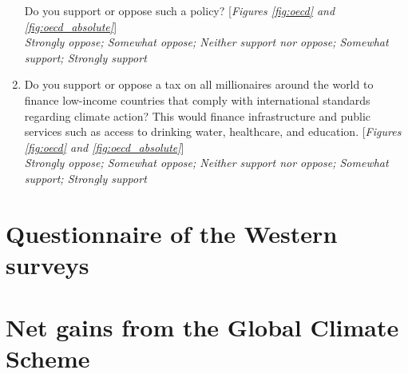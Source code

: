 \begin{enumerate}
Do you support or oppose such a policy?  [\textit{Figures \ref{fig:oecd} and \ref{fig:oecd_absolute}}]
\\ \textit{Strongly oppose; Somewhat oppose; Neither support nor oppose; Somewhat support; Strongly support}
\item \label{q:millionaire_tax} Do you support or oppose a tax on all millionaires around the world to finance low-income countries that comply with international standards regarding climate action? 
This would finance infrastructure and public services such as access to drinking water, healthcare, and education. [\textit{Figures \ref{fig:oecd} and \ref{fig:oecd_absolute}}]
\\ \textit{Strongly oppose; Somewhat oppose; Neither support nor oppose; Somewhat support; Strongly support}
\end{enumerate}



\renewcommand{\theenumi}{\arabic{enumi}}
\clearpage
\section{Questionnaire of the Western surveys}\label{app:questionnaire}



\clearpage
\section{Net gains from the Global Climate Scheme}\label{app:gain_gcs}

